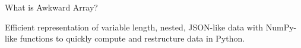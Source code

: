 \documentclass[aspectratio=169]{beamer}
\begin{document}
\begin{frame}{What is Awkward Array?}
\large
\vspace{0.25 cm}

Efficient representation of variable length, nested, JSON-like data with NumPy-like functions to quickly compute and restructure data in Python.

\begin{columns}
\end{columns}
\end{frame}
\end{document}
